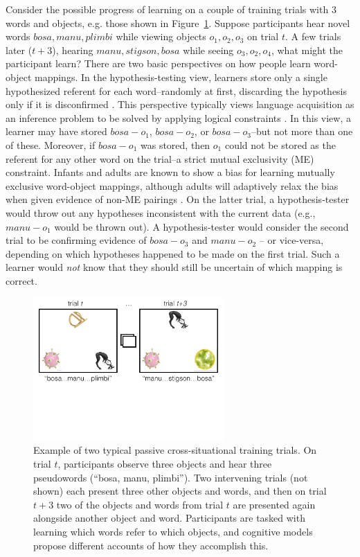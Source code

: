 \documentclass[man,floatsintext]{apa6}
\begin{document}
Consider the possible progress of learning on a couple of training trials with 3 words and objects, e.g. those shown in Figure~\ref{fig:intro_example}. Suppose participants hear novel words ${bosa, manu, plimbi}$ while viewing objects ${o_1, o_2, o_3}$ on trial $t$. A few trials later ($t+3$), hearing ${manu, stigson, bosa}$ while seeing ${o_3, o_2, o_4}$, what might the participant learn? There are two basic perspectives on how people learn word-object mappings. In the hypothesis-testing view, learners store only a single hypothesized referent for each word--randomly at first, discarding the hypothesis only if it is disconfirmed \citep{Medina:2011,Trueswell:2013}. This perspective typically views language acquisition as an inference problem to be solved by applying logical constraints \citep{Siskind:1996}. In this view, a learner may have stored $bosa-o_1$, $bosa-o_2$, or $bosa-o_3$--but not more than one of these. Moreover, if $bosa-o_1$ was stored, then $o_1$ could not be stored as the referent for any other word on the trial--a strict mutual exclusivity (ME) constraint. Infants and adults are known to show a bias for learning mutually exclusive word-object mappings, although adults will adaptively relax the bias when given evidence of non-ME pairings \citep{Kachergis:2012gi}. On the latter trial, a hypothesis-tester would throw out any hypotheses inconsistent with the current data (e.g., $manu-o_1$ would be thrown out). A hypothesis-tester would consider the second trial to be confirming evidence of $bosa-o_3$ and $manu-o_2$ -- or vice-versa, depending on which hypotheses happened to be made on the first trial. Such a learner would \textit{not} know that they should still be uncertain of which mapping is correct.

\begin{figure}[h]
  \centering
  \includegraphics[width=0.65\textwidth]{intro_example}
  \caption{Example of two typical passive cross-situational training trials. On trial $t$, participants observe three objects and hear three pseudowords (``bosa, manu, plimbi''). Two intervening trials (not shown) each present three other objects and words, and then on trial $t+3$ two of the objects and words from trial $t$ are presented again alongside another object and word. Participants are tasked with learning which words refer to which objects, and cognitive models propose different accounts of how they accomplish this.}
  \label{fig:intro_example}
\end{figure} 
\end{document}
